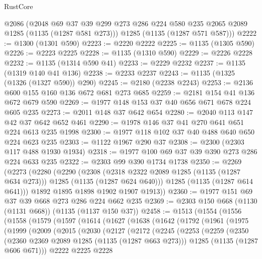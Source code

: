 \begin{lexlean}{RustCore}
\begin{coremodule}
      @2086
      (@2048 @69 @37 @39 @299 @273 @286 @224 @580 @235 @2065 @2089 @1285 (@1135 (@1287 @581 @273)))
      @1285
      (@1135 (@1287 @571 @587)))
@2222 := @1300 (@1301 @590)
@2223 := @2220 @2222
@2225 := @1135 (@1305 @590)
@2226 := @2223 @2225
@2228 := @1135 (@1310 @590)
@2229 := @2226 @2228
@2232 := @1135 (@1314 @590 @41)
@2233 := @2229 @2232
@2237 := @1135 (@1319 @140 @41 @136)
@2238 := @2233 @2237
@2243 := @1135 (@1325 (@1326 (@1327 @590)) @290)
@2245 := @2180 (@2238 @2243)
@2253 := @2136 @600 @155 @160 @136 @672 @681 @273 @685
@2259 := @2181 @154 @41 @136 @672 @679 @590
@2269 := @1977 @148 @153 @37 @40 @656 @671 @678 @224 @605 @235
@2273 := @2011 @148 @37 @642 @654
@2280 := @2040 @113 @147 @42 @37 @642 @652 @461
@2290 := @1978 @146 @37 @41 @270 @641 @651 @224 @613 @235 @1998
@2300 := @1977 @118 @102 @37 @40 @488 @640 @650 @224 @623 @235
@2303 := @1122 @1967 @290 @37
@2308 := @2300 (@2303 @117 @488 @1930 @1934)
@2318 := @1977 @100 @69 @37 @39 @390 @273 @286 @224 @633 @235
@2322 := @2303 @99 @390 @1734 @1738
@2350 := @2269
    (@2273
      (@2280
        (@2290
          (@2308
            (@2318 @2322 @2089 @1285 (@1135 (@1287 @634 @273)))
            @1285
            (@1135 (@1287 @624 @640)))
          @1285
          (@1135 (@1287 @614 @641)))
        @1892
        @1895
        @1898
        @1902
        @1907
        @1913))
@2360 := @1977 @151 @69 @37 @39 @668 @273 @286 @224 @662 @235
@2369 := @2303 @150 @668 (@1130 (@1131 @668)) (@1135 (@1137 @150 @37))
@2458 := @1513
    (@1554
      (@1556
        (@1558
          (@1579
            (@1597
              (@1614
                (@1627
                  (@1638
                    (@1642
                      (@1792
                        (@1961
                          (@1975
                            (@1999
                              (@2009
                                (@2015
                                  (@2030
                                    (@2127
                                      (@2172
                                        (@2245
                                          (@2253
                                            (@2259
                                              (@2350
                                                (@2360 @2369 @2089 @1285 (@1135 (@1287 @663 @273)))
                                                @1285
                                                (@1135 (@1287 @606 @671)))
                                              @2222
                                              @2225
                                              @2228

\end{coremodule}
\end{lexlean}
